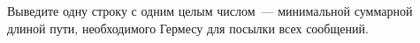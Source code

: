 Выведите одну строку с одним целым числом~--- минимальной суммарной длиной пути, необходимого Гермесу для посылки всех сообщений.